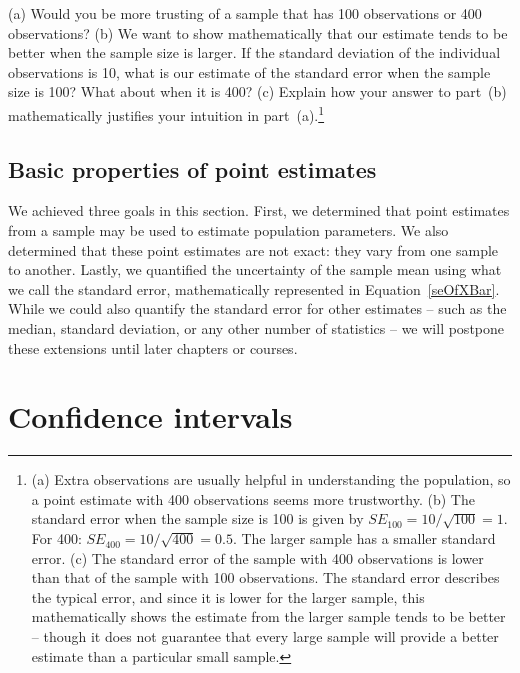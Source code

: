 \textC{\pagebreak}

\begin{exercise}
(a) Would you be more trusting of a sample that has 100 observations or 400 observations? (b) We want to show mathematically that our estimate tends to be better when the sample size is larger. If the standard deviation of the individual observations is 10, what is our estimate of the standard error when the sample size is 100? What about when it is 400? (c) Explain how your answer to part~(b) mathematically justifies your intuition in part~(a).\footnote{(a) Extra observations are usually helpful in understanding the population, so a point estimate with 400 observations seems more trustworthy. (b) The standard error when the sample size is 100 is given by $SE_{100} = 10/\sqrt{100} = 1$. For 400: $SE_{400} = 10/\sqrt{400} = 0.5$. The larger sample has a smaller standard error. (c) The standard error of the sample with 400 observations is lower than that of the sample with 100 observations. The standard error describes the typical error, and since it is lower for the larger sample, this mathematically shows the estimate from the larger sample tends to be better -- though it does not guarantee that every large sample will provide a better estimate than a particular small sample.}
\end{exercise}

\subsection{Basic properties of point estimates}

We achieved three goals in this section. First, we determined that point estimates from a sample may be used to estimate population parameters. We also determined that these point estimates are not exact: they vary from one sample to another. Lastly, we quantified the uncertainty of the sample mean using what we call the standard error, mathematically represented in Equation~\eqref{seOfXBar}. While we could also quantify the standard error for other estimates -- such as the median, standard deviation, or any other number of statistics -- we will postpone these extensions until later chapters or courses.



\section[Confidence intervals]{Confidence intervals }
\label{confidenceIntervals}

